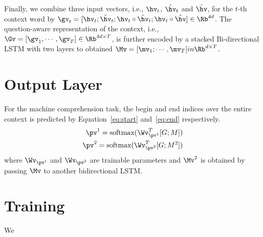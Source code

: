 \documentclass[11pt,letterpaper]{article}
\begin{document}
Finally, we combine three input vectors, i.e., $\hv_t$, $\tilde{\hv}_t$ and $\hat{\hv}$, for the $t$-th context word by $\gv_t = [\hv_t; \tilde{\hv}_t; \hv_t \circ \tilde{\hv}_t; \hv_t \circ \hat{\hv}]\in \Rb^{4d}$. The question-aware representation of the context, i.e., $\Gv=[\gv_1, \cdots, \gv_T]\in\Rb^{4d\times T}$, is further encoded by a stacked Bi-directional LSTM with two layers to obtained $\Mv=[\mv_1; \cdots, \mv_T]in \Rb^{d\times T}$.

\section{Output Layer}
For the machine comprehension task, the begin and end indices over the entire context is predicted by Equation~\ref{eq:start} and~\ref{eq:end} respectively. 
\begin{align}\label{eq:start}
    \pv^1 = \textnormal{softmax}(\Wv^T_{\pv^1} [G;M]) \\\label{eq:end}
    \pv^2 = \textnormal{softmax}(\Wv^T_{\pv^2} [G;M^2])
\end{align}
where $\Wv_{\pv^1}$ and $\Wv_{\pv^2}$ are trainable parameters and $\Mv^2$ is obtained by passing $\Mv$ to another bidirectional LSTM.

\section{Training}
We 


\end{document}
